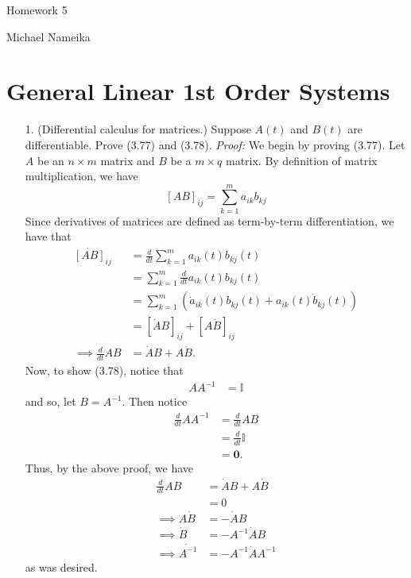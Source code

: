 \documentclass{article}
\begin{document}
\begin{center}
    {\Huge Homework 5}
    \vspace{0.5cm}

    {\Large Michael Nameika}
\end{center}

\section*{General Linear 1st Order Systems}
\begin{itemize}
    \item[1.] (Differential calculus for matrices.) Suppose $A(t)$ and $B(t)$ are differentiable. Prove (3.77) and (3.78).
    \newline\newline
    \textit{Proof:} We begin by proving (3.77). Let $A$ be an $n\times m$ matrix and $B$ be a $m \times q$ matrix. By definition of matrix multiplication, we have
    \[[AB]_{ij} = \sum_{k = 1}^m a_{ik}b_{kj}\]
    Since derivatives of matrices are defined as term-by-term differentiation, we have that
    \begin{align*}
        \dot{[AB]}_{ij} &= \frac{d}{dt}\sum_{k = 1}^m a_{ik}(t)b_{kj}(t)\\
        &= \sum_{k = 1}^m \frac{d}{dt}a_{ik}(t)b_{kj}(t)\\
        &= \sum_{k = 1}^m (\dot{a}_{ik}(t)b_{kj}(t) + a_{ik}(t)\dot{b}_{kj}(t))\\
        &= [\dot{A}B]_{ij} + [A\dot{B}]_{ij}\\
        \implies \frac{d}{dt}AB &= \dot{A}B + A\dot{B}.
    \end{align*}
    Now, to show (3.78), notice that
    \begin{align*}
        AA^{-1} &= \mathbb{I}
    \end{align*}
    and so, let $B = A^{-1}$. Then notice
    \begin{align*}
        \frac{d}{dt} AA^{-1} &= \frac{d}{dt} AB\\
        &= \frac{d}{dt}\mathbb{I}\\
        &= \mathbf{0}.
    \end{align*}
    Thus, by the above proof, we have
    \begin{align*}
        \frac{d}{dt}AB &= \dot{A}B + A\dot{B}\\
        &= 0\\
        \implies A\dot{B} &= -\dot{A}B\\
        \implies \dot{B} &= -A^{-1}\dot{A}B\\
        \implies \dot{A^{-1}} &= -A^{-1}\dot{A}A^{-1}
    \end{align*}
    as was desired.
    \pagebreak


\end{itemize}
\end{document}
